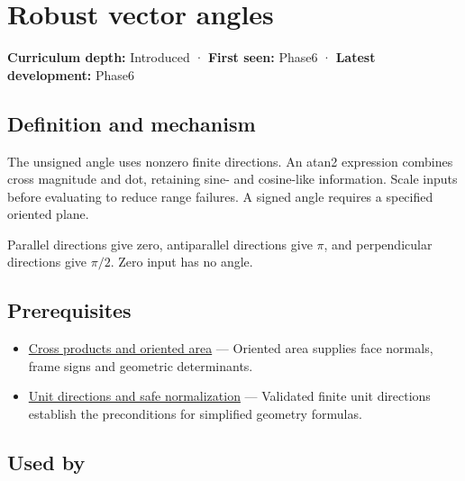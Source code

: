 \hypertarget{appendix-e569e60e18e6}{}\label{referencestart:appendix-e569e60e18e6}
\section{Robust vector angles}\label{appendix-e569e60e18e6-robust-vector-angles}

\textbf{Curriculum depth:} Introduced · \textbf{First seen:} Phase6 · \textbf{Latest development:} Phase6

\begin{allmightroledefinition}

\subsection{Definition and mechanism}\label{appendix-e569e60e18e6-definition-and-mechanism}

The unsigned angle uses nonzero finite directions. An atan2 expression combines cross magnitude and dot, retaining sine- and cosine-like information. Scale inputs before evaluating to reduce range failures. A signed angle requires a specified oriented plane.

\end{allmightroledefinition}

Parallel directions give zero, antiparallel directions give \(\pi\), and perpendicular directions give \(\pi/2\). Zero input has no angle.

\subsection{Prerequisites}\label{appendix-e569e60e18e6-prerequisites}

\begin{itemize}
\tightlist
\item
  \hyperref[appendix-2391db8052b1]{Cross products and oriented area} --- Oriented area supplies face normals, frame signs and geometric determinants.
\item
  \hyperref[appendix-f744e41b95b4]{Unit directions and safe normalization} --- Validated finite unit directions establish the preconditions for simplified geometry formulas.
\end{itemize}

\subsection{Used by}\label{appendix-e569e60e18e6-used-by}

